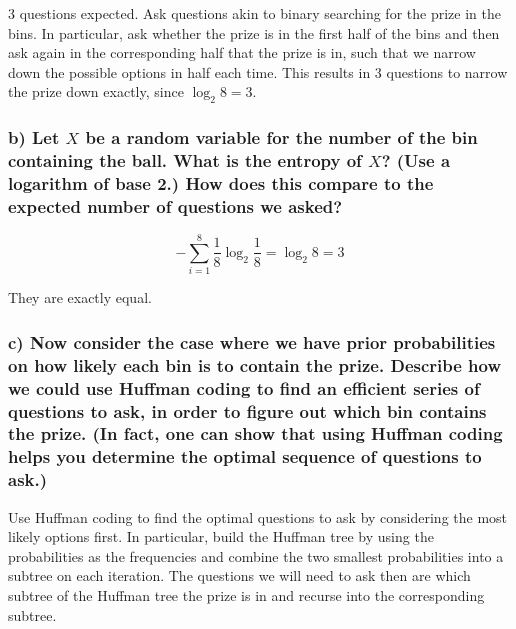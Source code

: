 \documentclass[11pt]{article}
\begin{document}
    3 questions expected. Ask questions akin to binary searching for the
prize in the bins. In particular, ask whether the prize is in the first
half of the bins and then ask again in the corresponding half that the
prize is in, such that we narrow down the possible options in half each
time. This results in 3 questions to narrow the prize down exactly,
since \(\log_{2}{8} = 3\).

    \subsubsection{\texorpdfstring{ b) Let \(X\) be a random variable for
the number of the bin containing the ball. What is the entropy of \(X\)?
(Use a logarithm of base 2.) How does this compare to the expected
number of questions we
asked?}{ b) Let X be a random variable for the number of the bin containing the ball. What is the entropy of X? (Use a logarithm of base 2.) How does this compare to the expected number of questions we asked?}}\label{b-let-x-be-a-random-variable-for-the-number-of-the-bin-containing-the-ball.-what-is-the-entropy-of-x-use-a-logarithm-of-base-2.-how-does-this-compare-to-the-expected-number-of-questions-we-asked}

    \[-\sum_{i = 1}^{8} \frac{1}{8} \log_{2}{\frac{1}{8}} = \log_{2}{8} = 3\]

They are exactly equal.

    \subsubsection{ c) Now consider the case where we have prior
probabilities on how likely each bin is to contain the prize. Describe
how we could use Huffman coding to find an efficient series of questions
to ask, in order to figure out which bin contains the prize. (In fact,
one can show that using Huffman coding helps you determine the optimal
sequence of questions to
ask.)}\label{c-now-consider-the-case-where-we-have-prior-probabilities-on-how-likely-each-bin-is-to-contain-the-prize.-describe-how-we-could-use-huffman-coding-to-find-an-efficient-series-of-questions-to-ask-in-order-to-figure-out-which-bin-contains-the-prize.-in-fact-one-can-show-that-using-huffman-coding-helps-you-determine-the-optimal-sequence-of-questions-to-ask.}

    Use Huffman coding to find the optimal questions to ask by considering
the most likely options first. In particular, build the Huffman tree by
using the probabilities as the frequencies and combine the two smallest
probabilities into a subtree on each iteration. The questions we will
need to ask then are which subtree of the Huffman tree the prize is in
and recurse into the corresponding subtree.
\end{document}
